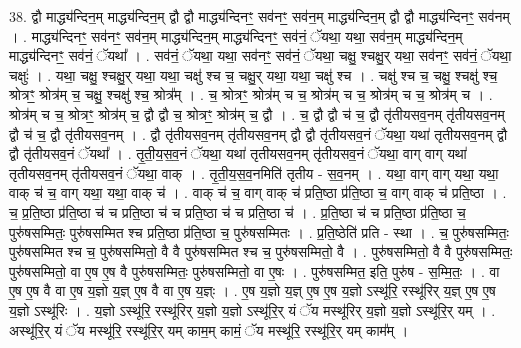 \documentclass[17pt]{extarticle}
\begin{document}
38. द्वौ माद्ध्य॑न्दिन॒म् माद्ध्य॑न्दिन॒म् द्वौ द्वौ माद्ध्य॑न्दिनꣳ॒॒ सव॑नꣳ॒॒ सव॑न॒म् माद्ध्य॑न्दिन॒म् द्वौ द्वौ माद्ध्य॑न्दिनꣳ॒॒ सव॑नम् । . माद्ध्य॑न्दिनꣳ॒॒ सव॑नꣳ॒॒ सव॑न॒म् माद्ध्य॑न्दिन॒म् माद्ध्य॑न्दिनꣳ॒॒ सव॑नं॒ ॅयथा॒ यथा॒ सव॑न॒म् माद्ध्य॑न्दिन॒म् माद्ध्य॑न्दिनꣳ॒॒ सव॑नं॒ ॅयथा᳚ । . सव॑नं॒ ॅयथा॒ यथा॒ सव॑नꣳ॒॒ सव॑नं॒ ॅयथा॒ चक्षु॒ श्चक्षु॒र् यथा॒ सव॑नꣳ॒॒ सव॑नं॒ ॅयथा॒ चक्षुः॑ । . यथा॒ चक्षु॒ श्चक्षु॒र् यथा॒ यथा॒ चक्षु॑ श्च च॒ चक्षु॒र् यथा॒ यथा॒ चक्षु॑ श्च । . चक्षु॑ श्च च॒ चक्षु॒ श्चक्षु॑ श्च॒ श्रोत्रꣳ॒॒ श्रोत्र॑म् च॒ चक्षु॒ श्चक्षु॑ श्च॒ श्रोत्र᳚म् । . च॒ श्रोत्रꣳ॒॒ श्रोत्र॑म् च च॒ श्रोत्र॑म् च च॒ श्रोत्र॑म् च च॒ श्रोत्र॑म् च । . श्रोत्र॑म् च च॒ श्रोत्रꣳ॒॒ श्रोत्र॑म् च॒ द्वौ द्वौ च॒ श्रोत्रꣳ॒॒ श्रोत्र॑म् च॒ द्वौ । . च॒ द्वौ द्वौ च॑ च॒ द्वौ तृ॑तीयसव॒नम् तृ॑तीयसव॒नम् द्वौ च॑ च॒ द्वौ तृ॑तीयसव॒नम् । . द्वौ तृ॑तीयसव॒नम् तृ॑तीयसव॒नम् द्वौ द्वौ तृ॑तीयसव॒नं ॅयथा॒ यथा॑ तृतीयसव॒नम् द्वौ द्वौ तृ॑तीयसव॒नं ॅयथा᳚ । . तृ॒ती॒य॒स॒व॒नं ॅयथा॒ यथा॑ तृतीयसव॒नम् तृ॑तीयसव॒नं ॅयथा॒ वाग् वाग् यथा॑ तृतीयसव॒नम् तृ॑तीयसव॒नं ॅयथा॒ वाक् । . तृ॒ती॒य॒स॒व॒नमिति॑ तृतीय - स॒व॒नम् । . यथा॒ वाग् वाग् यथा॒ यथा॒ वाक् च॑ च॒ वाग् यथा॒ यथा॒ वाक् च॑ । . वाक् च॑ च॒ वाग् वाक् च॑ प्रति॒ष्ठा प्र॑ति॒ष्ठा च॒ वाग् वाक् च॑ प्रति॒ष्ठा । . च॒ प्र॒ति॒ष्ठा प्र॑ति॒ष्ठा च॑ च प्रति॒ष्ठा च॑ च प्रति॒ष्ठा च॑ च प्रति॒ष्ठा च॑ । . प्र॒ति॒ष्ठा च॑ च प्रति॒ष्ठा प्र॑ति॒ष्ठा च॒ पुरु॑षसम्मितः॒ पुरु॑षसम्मित श्च प्रति॒ष्ठा प्र॑ति॒ष्ठा च॒ पुरु॑षसम्मितः । . प्र॒ति॒ष्ठेति॑ प्रति - स्था । . च॒ पुरु॑षसम्मितः॒ पुरु॑षसम्मित श्च च॒ पुरु॑षसम्मितो॒ वै वै पुरु॑षसम्मित श्च च॒ पुरु॑षसम्मितो॒ वै । . पुरु॑षसम्मितो॒ वै वै पुरु॑षसम्मितः॒ पुरु॑षसम्मितो॒ वा ए॒ष ए॒ष वै पुरु॑षसम्मितः॒ पुरु॑षसम्मितो॒ वा ए॒षः । . पुरु॑षसम्मित॒ इति॒ पुरु॑ष - स॒म्मि॒तः॒ । . वा ए॒ष ए॒ष वै वा ए॒ष य॒ज्ञो य॒ज्ञ् ए॒ष वै वा ए॒ष य॒ज्ञ्ः । . ए॒ष य॒ज्ञो य॒ज्ञ् ए॒ष ए॒ष य॒ज्ञो ऽस्थू॑रि॒ रस्थू॑रिर् य॒ज्ञ् ए॒ष ए॒ष य॒ज्ञो ऽस्थू॑रिः । . य॒ज्ञो ऽस्थू॑रि॒ रस्थू॑रिर् य॒ज्ञो य॒ज्ञो ऽस्थू॑रि॒र् यं ॅय मस्थू॑रिर् य॒ज्ञो य॒ज्ञो ऽस्थू॑रि॒र् यम् । . अस्थू॑रि॒र् यं ॅय मस्थू॑रि॒ रस्थू॑रि॒र् यम् काम॒म् कामं॒ ॅय मस्थू॑रि॒ रस्थू॑रि॒र् यम् काम᳚म् । \newline
\pagebreak
{}
\end{document}

